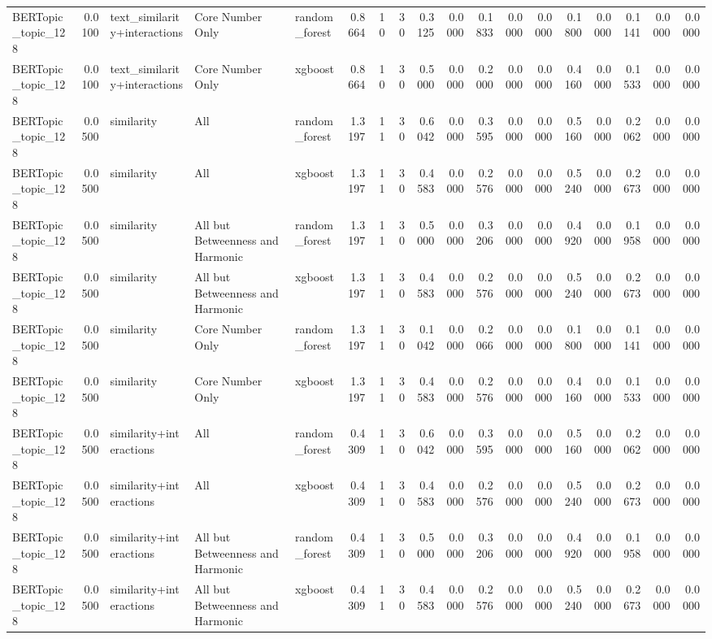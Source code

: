 \begin{tabular}{lrlllrrrrrrrrrrrrr}
BERTopic_topic_128 & 0.0100 & text_similarity+interactions & Core Number Only & random_forest & 0.8664 & 10 & 30 & 0.3125 & 0.0000 & 0.1833 & 0.0000 & 0.0000 & 0.1800 & 0.0000 & 0.1141 & 0.0000 & 0.0000 \\
BERTopic_topic_128 & 0.0100 & text_similarity+interactions & Core Number Only & xgboost & 0.8664 & 10 & 30 & 0.5000 & 0.0000 & 0.2000 & 0.0000 & 0.0000 & 0.4160 & 0.0000 & 0.1533 & 0.0000 & 0.0000 \\
BERTopic_topic_128 & 0.0500 & similarity & All & random_forest & 1.3197 & 11 & 30 & 0.6042 & 0.0000 & 0.3595 & 0.0000 & 0.0000 & 0.5160 & 0.0000 & 0.2062 & 0.0000 & 0.0000 \\
BERTopic_topic_128 & 0.0500 & similarity & All & xgboost & 1.3197 & 11 & 30 & 0.4583 & 0.0000 & 0.2576 & 0.0000 & 0.0000 & 0.5240 & 0.0000 & 0.2673 & 0.0000 & 0.0000 \\
BERTopic_topic_128 & 0.0500 & similarity & All but Betweenness and Harmonic & random_forest & 1.3197 & 11 & 30 & 0.5000 & 0.0000 & 0.3206 & 0.0000 & 0.0000 & 0.4920 & 0.0000 & 0.1958 & 0.0000 & 0.0000 \\
BERTopic_topic_128 & 0.0500 & similarity & All but Betweenness and Harmonic & xgboost & 1.3197 & 11 & 30 & 0.4583 & 0.0000 & 0.2576 & 0.0000 & 0.0000 & 0.5240 & 0.0000 & 0.2673 & 0.0000 & 0.0000 \\
BERTopic_topic_128 & 0.0500 & similarity & Core Number Only & random_forest & 1.3197 & 11 & 30 & 0.1042 & 0.0000 & 0.2066 & 0.0000 & 0.0000 & 0.1800 & 0.0000 & 0.1141 & 0.0000 & 0.0000 \\
BERTopic_topic_128 & 0.0500 & similarity & Core Number Only & xgboost & 1.3197 & 11 & 30 & 0.4583 & 0.0000 & 0.2576 & 0.0000 & 0.0000 & 0.4160 & 0.0000 & 0.1533 & 0.0000 & 0.0000 \\
BERTopic_topic_128 & 0.0500 & similarity+interactions & All & random_forest & 0.4309 & 11 & 30 & 0.6042 & 0.0000 & 0.3595 & 0.0000 & 0.0000 & 0.5160 & 0.0000 & 0.2062 & 0.0000 & 0.0000 \\
BERTopic_topic_128 & 0.0500 & similarity+interactions & All & xgboost & 0.4309 & 11 & 30 & 0.4583 & 0.0000 & 0.2576 & 0.0000 & 0.0000 & 0.5240 & 0.0000 & 0.2673 & 0.0000 & 0.0000 \\
BERTopic_topic_128 & 0.0500 & similarity+interactions & All but Betweenness and Harmonic & random_forest & 0.4309 & 11 & 30 & 0.5000 & 0.0000 & 0.3206 & 0.0000 & 0.0000 & 0.4920 & 0.0000 & 0.1958 & 0.0000 & 0.0000 \\
BERTopic_topic_128 & 0.0500 & similarity+interactions & All but Betweenness and Harmonic & xgboost & 0.4309 & 11 & 30 & 0.4583 & 0.0000 & 0.2576 & 0.0000 & 0.0000 & 0.5240 & 0.0000 & 0.2673 & 0.0000 & 0.0000 \\

\end{tabular}
